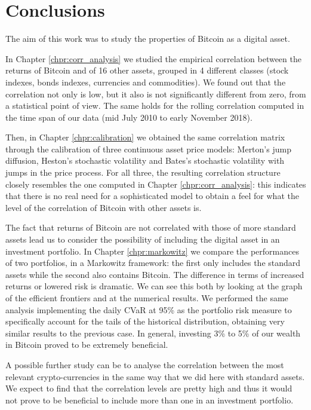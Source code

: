 \chapter{Conclusions}
\label{chpr:conclusion}


The aim of this work was to study the properties of Bitcoin as a digital asset.

In Chapter \ref{chpr:corr_analysis} we studied the empirical correlation between the returns of Bitcoin and of 16 other assets, grouped in 4 different classes (stock indexes, bonds indexes, currencies and commodities). We found out that the correlation not only is low, but it also is not significantly different from zero, from a statistical point of view. The same holds for the rolling correlation computed in the time span of our data (mid July 2010 to early November 2018).

Then, in Chapter \ref{chpr:calibration} we obtained the same correlation matrix through the calibration of three continuous asset price models: Merton's jump diffusion, Heston's stochastic volatility and Bates's stochastic volatility with jumps in the price process.
For all three, the resulting correlation structure closely resembles the one computed in Chapter \ref{chpr:corr_analysis}: this indicates that there is no real need for a sophisticated model to obtain a feel for what the level of the correlation of Bitcoin with other assets is.

The fact that returns of Bitcoin are not correlated with those of more standard assets lead us to consider the possibility of including the digital asset in an investment portfolio.
In Chapter \ref{chpr:markowitz} we compare the performances of two portfolios, in a Markowitz framework: the first only includes the standard assets while the second also contains Bitcoin. The difference in terms of increased returns or lowered risk is dramatic. We can see this both by looking at the graph of the efficient frontiers and at the numerical results.
We performed the same analysis implementing the daily CVaR at 95\% as the portfolio risk measure to specifically account for the tails of the historical distribution, obtaining very similar results to the previous case.
In general, investing 3\% to 5\% of our wealth in Bitcoin proved to be extremely beneficial.

\bigskip

A possible further study can be to analyse the correlation between the most relevant crypto-currencies in the same way that we did here with standard assets. We expect to find that the correlation levels are pretty high and thus it would not prove to be beneficial to include more than one in an investment portfolio. 

